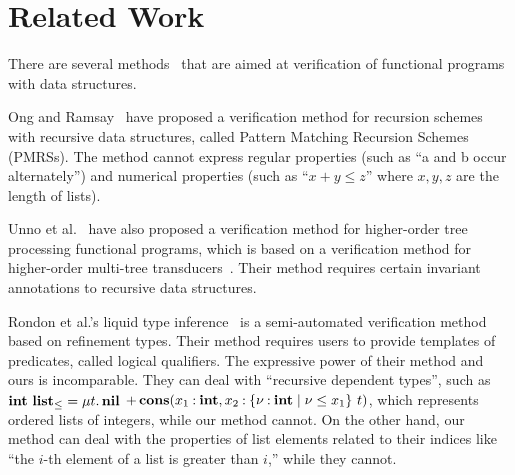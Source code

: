 \section{Related Work}
\label{sec:related}

There are several
methods~\cite{Ong2011,Kobayashi2010,Unno2010,Rondon2008,Kawaguchi2009,Chin2003}
that are aimed at verification of functional programs with data
structures.

Ong and Ramsay~\cite{Ong2011} have proposed a verification method for
recursion schemes with recursive data structures, called Pattern Matching
Recursion Schemes (PMRSs).  The method cannot express regular properties
(such as ``a and b occur alternately'') and numerical properties (such
as ``$x+y \leq z$'' where $x,y,z$ are the length of lists).

Unno et al.~\cite{Unno2010} have also proposed a verification method for 
higher-order tree processing functional programs, which is based on a 
verification method for higher-order multi-tree 
transducers~\cite{Kobayashi2010}. Their method requires certain 
invariant annotations to recursive data structures.

Rondon et al.'s liquid type inference~\cite{Rondon2008,Kawaguchi2009} is a
semi-automated verification method based on refinement types.  Their method requires
users to provide templates of predicates, called logical qualifiers.  The
expressive power of their method and ours is incomparable.  They can
deal with ``recursive dependent types'', such as ${\mathbf{int}}~{\mathbf{list}_\leq}
= \mu t.\, \mathbf{nil}$ $\mathop{+}
\mathbf{cons}({x_1\mathbin{:}\mathbf{int}},{x_2\mathbin{:}{\{\nu\mathbin{:}\mathbf{int} \mid \nu \leq x_1\}}~{t}})$,
which represents ordered lists of integers, while our method cannot. On
the other hand, our method can deal with the properties of list elements
related to their indices like ``the $i$-th element of a list is greater
than $i$,'' while they cannot.

